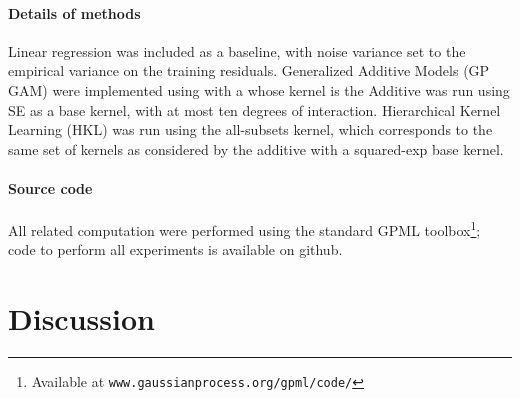 \documentclass[twoside]{article}
\begin{document}
\paragraph{Details of methods}

Linear regression was included as a baseline, with noise variance set to the empirical variance on the training residuals.
%
Generalized Additive Models (GP GAM) were implemented using with a \gp{} whose kernel is the 
%
Additive \gp{} was run using SE as a base kernel, with at most ten degrees of interaction.
%
Hierarchical Kernel Learning (HKL)
was run using the all-subsets kernel, which corresponds to the same set of kernels as considered by the additive \gp{} with a squared-exp base kernel.
%

\paragraph{Source code}All \gp{} related computation were performed using the standard GPML toolbox\footnote{Available at \texttt{www.gaussianprocess.org/gpml/code/}}; code to perform all experiments is available on github.



\section{Discussion}
\end{document}
